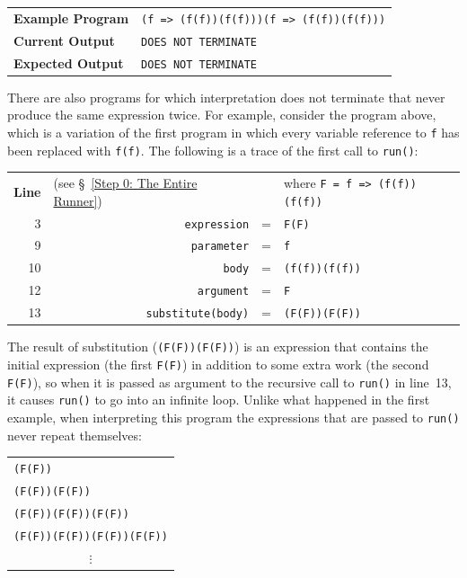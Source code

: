 \documentclass[12pt, oneside]{book}
\begin{document}
\begin{center}
\begin{tabular}{ll}
\textbf{Example Program} & \texttt{(f => (f(f))(f(f)))(f => (f(f))(f(f)))} \\
\textbf{Current Output} & \texttt{DOES NOT TERMINATE} \\
\textbf{Expected Output} & \texttt{DOES NOT TERMINATE} \\
\end{tabular}
\end{center}

There are also programs for which interpretation does not terminate that never produce the same expression twice. For example, consider the program above, which is a variation of the first program in which every variable reference to \texttt{f} has been replaced with \texttt{f(f)}. The following is a trace of the first call to \texttt{run()}:

\begin{center}
\begin{tabular}{rrcl}
\textbf{Line} & \multicolumn{1}{l}{(see §~\ref{Step 0: The Entire Runner})} & & where \texttt{F = f => (f(f))(f(f))} \\
3 & \texttt{expression} & = & \texttt{F(F)} \\
9 & \texttt{parameter} & = & \texttt{f} \\
10 & \texttt{body} & = & \texttt{(f(f))(f(f))} \\
12 & \texttt{argument} & = & \texttt{F} \\
13 & \texttt{substitute(body)} & = & \texttt{(F(F))(F(F))} \\
\end{tabular}
\end{center}

The result of substitution (\texttt{(F(F))(F(F))}) is an expression that contains the initial expression (the first \texttt{F(F)}) in addition to some extra work (the second \texttt{F(F)}), so when it is passed as argument to the recursive call to \texttt{run()} in line~13, it causes \texttt{run()} to go into an infinite loop. Unlike what happened in the first example, when interpreting this program the expressions that are passed to \texttt{run()} never repeat themselves:

\begin{center}
\begin{tabular}{l}
\texttt{(F(F))} \\
\texttt{(F(F))(F(F))} \\
\texttt{(F(F))(F(F))(F(F))} \\
\texttt{(F(F))(F(F))(F(F))(F(F))} \\
\multicolumn{1}{c}{$\vdots$} \\
\end{tabular}
\end{center}
\end{document}
